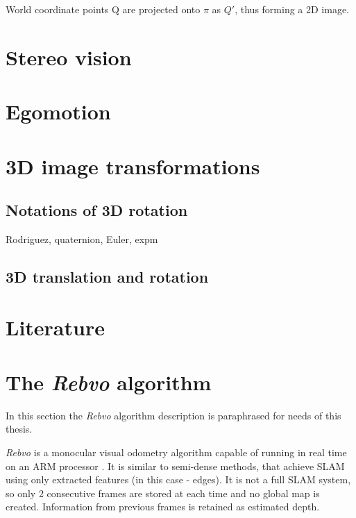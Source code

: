 World coordinate points Q are projected onto \(\pi\) as \(Q'\), thus forming a 2D image.


\section{Stereo vision}
\label{sec:stereo}



\section{Egomotion}
\label{sec:ego}


\section{3D image transformations}
\label{sec:3dtrans}

\subsection{Notations of 3D rotation}

Rodriguez, quaternion, Euler, expm

\subsection{3D translation and rotation}


\section{Literature}



\section{The \textit{Rebvo} algorithm}

In this section the \textit{Rebvo} algorithm \cite{jose2015realtime} description is paraphrased for needs of this thesis.

\textit{Rebvo} is a monocular visual odometry algorithm capable of running in real time on an ARM processor \cite{jose2015realtime}. It is similar to semi-dense methods, that achieve SLAM using only extracted features (in this case - edges). It is not a full SLAM system, so only 2 consecutive frames are stored at each time and no global map is created. Information from previous frames is retained as estimated depth.


